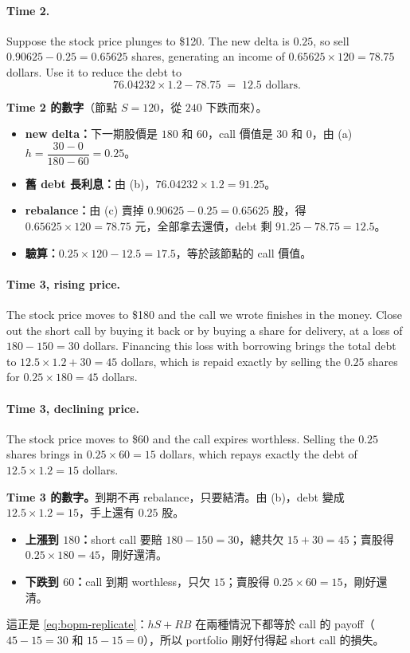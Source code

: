 \paragraph{Time 2.}
Suppose the stock price plunges to \$120.
The new delta is $0.25$, so sell $0.90625-0.25=0.65625$ shares, generating an income of $0.65625\times120=78.75$ dollars.
Use it to reduce the debt to
\[
	76.04232\times1.2-78.75 \;=\; 12.5 \text{ dollars}.
\]

\suppstart
\begin{remark}
	\textbf{Time 2 的數字}（節點 $S=120$，從 $240$ 下跌而來）。
	\begin{itemize}[nosep]
		\item \textbf{new delta：}下一期股價是 $180$ 和 $60$，call 價值是 $30$ 和 $0$，由 (a) $h=\dfrac{30-0}{180-60}=0.25$。
		\item \textbf{舊 debt 長利息：}由 (b)，$76.04232\times1.2=91.25$。
		\item \textbf{rebalance：}由 (c) 賣掉 $0.90625-0.25=0.65625$ 股，得 $0.65625\times120=78.75$ 元，全部拿去還債，debt 剩 $91.25-78.75=12.5$。
		\item \textbf{驗算：}$0.25\times120-12.5=17.5$，等於該節點的 call 價值。
	\end{itemize}
\end{remark}
\suppend

\paragraph{Time 3, rising price.}
The stock price moves to \$180 and the call we wrote finishes in the money.
Close out the short call by buying it back or by buying a share for delivery, at a loss of $180-150=30$ dollars.
Financing this loss with borrowing brings the total debt to $12.5\times1.2+30=45$ dollars, which is repaid exactly by selling the $0.25$ shares for $0.25\times180=45$ dollars.

\paragraph{Time 3, declining price.}
The stock price moves to \$60 and the call expires worthless.
Selling the $0.25$ shares brings in $0.25\times60=15$ dollars, which repays exactly the debt of $12.5\times1.2=15$ dollars.

\suppstart
\begin{remark}
	\textbf{Time 3 的數字。}到期不再 rebalance，只要結清。由 (b)，debt 變成 $12.5\times1.2=15$，手上還有 $0.25$ 股。
	\begin{itemize}[nosep]
		\item \textbf{上漲到 $180$：}short call 要賠 $180-150=30$，總共欠 $15+30=45$；賣股得 $0.25\times180=45$，剛好還清。
		\item \textbf{下跌到 $60$：}call 到期 worthless，只欠 $15$；賣股得 $0.25\times60=15$，剛好還清。
	\end{itemize}
	這正是 \eqref{eq:bopm-replicate}：$hS+RB$ 在兩種情況下都等於 call 的 payoff（$45-15=30$ 和 $15-15=0$），所以 portfolio 剛好付得起 short call 的損失。
\end{remark}

